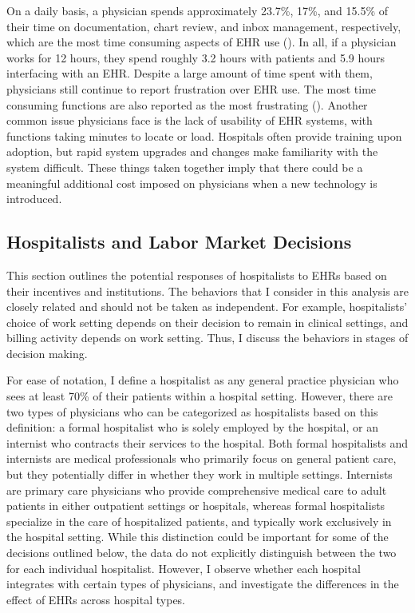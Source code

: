 \documentclass[12pt]{article}
\begin{document}
On a daily basis, a physician spends approximately 23.7\%, 17\%, and 15.5\% of their time on documentation, chart review, and inbox management, respectively, which are the most time consuming aspects of EHR use (\cite{arndt2017tethered}). In all, if a physician works for 12 hours, they spend roughly 3.2 hours with patients and 5.9 hours interfacing with an EHR. Despite a large amount of time spent with them, physicians still continue to report frustration over EHR use. The most time consuming functions are also reported as the most frustrating (\cite{dymek2021building}). Another common issue physicians face is the lack of usability of EHR systems, with functions taking minutes to locate or load. Hospitals often provide training upon adoption, but rapid system upgrades and changes make familiarity with the system difficult. These things taken together imply that there could be a meaningful additional cost imposed on physicians when a new technology is introduced. 

\subsection{Hospitalists and Labor Market Decisions}

This section outlines the potential responses of hospitalists to EHRs based on their incentives and institutions. The behaviors that I consider in this analysis are closely related and should not be taken as independent. For example, hospitalists' choice of work setting depends on their decision to remain in clinical settings, and billing activity depends on work setting. Thus, I discuss the behaviors in stages of decision making. 

For ease of notation, I define a hospitalist as any general practice physician who sees at least 70\% of their patients within a hospital setting. However, there are two types of physicians who can be categorized as hospitalists based on this definition: a formal hospitalist who is solely employed by the hospital, or an internist who contracts their services to the hospital. Both formal hospitalists and internists are medical professionals who primarily focus on general patient care, but they potentially differ in whether they work in multiple settings. Internists are primary care physicians who provide comprehensive medical care to adult patients in either outpatient settings or hospitals, whereas formal hospitalists specialize in the care of hospitalized patients, and typically work exclusively in the hospital setting. While this distinction could be important for some of the decisions outlined below, the data do not explicitly distinguish between the two for each individual hospitalist. However, I observe whether each hospital integrates with certain types of physicians, and investigate the differences in the effect of EHRs across hospital types. 
\end{document}
